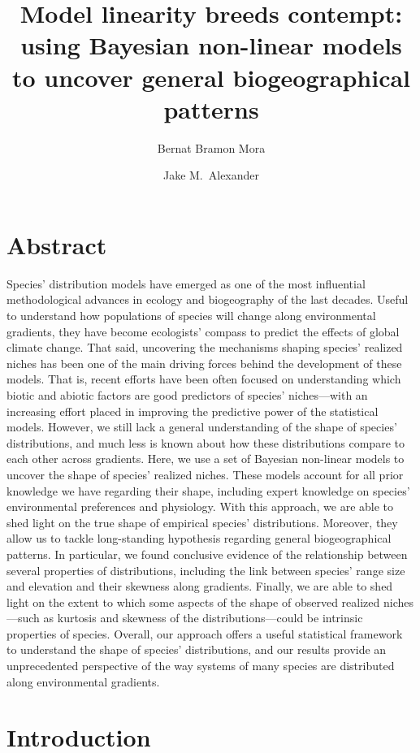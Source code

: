 \documentclass[11pt, a4paper]{article}
\title{\vspace{-1cm}
Model linearity breeds contempt: using Bayesian non-linear models to uncover general biogeographical patterns}
\author[1,*]{\normalsize Bernat Bramon Mora}
\author[1]{\normalsize Jake M.\ Alexander}
\affil[1]{\footnotesize Institute of Integrative Biology, ETH Zürich, Zürich, Switzerland}
\affil[*]{\footnotesize  bernat.bramon@gmail.com}
\date{}
\begin{document}
\maketitle
\linenumbers

\section*{Abstract}

Species' distribution models have emerged as one of the most influential methodological advances in ecology and biogeography of the last decades. Useful to understand how populations of species will change along environmental gradients, they have become ecologists' compass to predict the effects of global climate change. That said, uncovering the mechanisms shaping species' realized niches has been one of the main driving forces behind the development of these models. That is, recent efforts have been often focused on understanding which biotic and abiotic factors are good predictors of species' niches---with an increasing effort placed in improving the predictive power of the statistical models. However, we still lack a general understanding of the shape of species' distributions, and much less is known about how these distributions compare to each other across gradients. Here, we use a set of Bayesian non-linear models to uncover the shape of species' realized niches. These models account for all prior knowledge we have regarding their shape, including expert knowledge on species' environmental preferences and physiology. With this approach, we are able to shed light on the true shape of empirical species' distributions. Moreover, they allow us to tackle long-standing hypothesis regarding general biogeographical patterns. In particular, we found conclusive evidence of the relationship between several properties of distributions, including the link between species' range size and elevation and their skewness along gradients. Finally, we are able to shed light on the extent to which some aspects of the shape of observed realized niches---such as kurtosis and skewness of the distributions---could be intrinsic properties of species. Overall, our approach offers a useful statistical framework to understand the shape of species' distributions, and our results provide an unprecedented perspective of the way systems of many species are distributed along environmental gradients.

\section*{Introduction}
\end{document}

